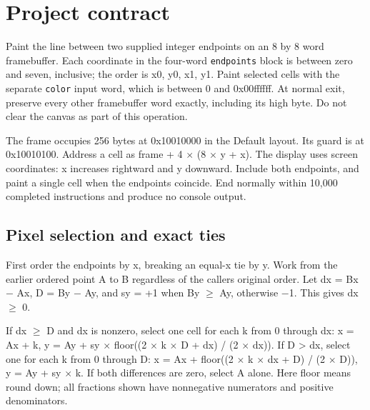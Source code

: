 \section{Project contract}\label{007-bresenham-line-assignment-rasterize-a-line-with-an-integer-decision-state}

Paint the line between two supplied integer endpoints on an 8 by 8 word
framebuffer. Each coordinate in the four-word \texttt{endpoints} block
is between zero and seven, inclusive; the order is x0, y0, x1, y1. Paint
selected cells with the separate \texttt{color} input word, which is
between 0 and 0x00ffffff. At normal exit, preserve every other
framebuffer word exactly, including its high byte. Do not clear the
canvas as part of this operation.

The frame occupies 256 bytes at 0x10010000 in the Default layout. Its
guard is at 0x10010100. Address a cell as frame + 4 \ensuremath{\times} (8 \ensuremath{\times} y + x). The
display uses screen coordinates: x increases rightward and y downward.
Include both endpoints, and paint a single cell when the endpoints
coincide. End normally within 10,000 completed instructions and produce
no console output.

\subsection{Pixel selection and exact
  ties}\label{007-bresenham-line-assignment-pixel-selection-and-exact-ties}

First order the endpoints by x, breaking an equal-x tie by y. Work from
the earlier ordered point A to B regardless of the
caller\textquotesingle s original order. Let dx = Bx \ensuremath{-} Ax, D =
\textbar By \ensuremath{-} Ay\textbar, and sy = +1 when By \ensuremath{\geq} Ay, otherwise \ensuremath{-}1. This
gives dx \ensuremath{\geq} 0.

If dx \ensuremath{\geq} D and dx is nonzero, select one cell for each k from 0 through
dx: x = Ax + k, y = Ay + sy \ensuremath{\times} floor((2 \ensuremath{\times} k \ensuremath{\times} D + dx) / (2 \ensuremath{\times} dx)). If D
\textgreater{} dx, select one for each k from 0 through D: x = Ax +
floor((2 \ensuremath{\times} k \ensuremath{\times} dx + D) / (2 \ensuremath{\times} D)), y = Ay + sy \ensuremath{\times} k. If both differences
are zero, select A alone. Here floor means round down; all fractions
shown have nonnegative numerators and positive denominators.

